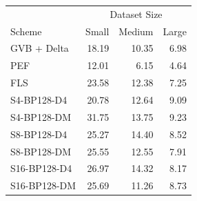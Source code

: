 \begin{tabular}{lrrr}
\toprule
 & \multicolumn{3}{c}{Dataset Size} \\
Scheme & Small & Medium & Large \\
\midrule
GVB + Delta & 18.19 & 10.35 & 6.98 \\
PEF & 12.01 & 6.15 & 4.64 \\
FLS & 23.58 & 12.38 & 7.25 \\
S4-BP128-D4 & 20.78 & 12.64 & 9.09 \\
S4-BP128-DM & 31.75 & 13.75 & 9.23 \\
S8-BP128-D4 & 25.27 & 14.40 & 8.52 \\
S8-BP128-DM & 25.55 & 12.55 & 7.91 \\
S16-BP128-D4 & 26.97 & 14.32 & 8.17 \\
S16-BP128-DM & 25.69 & 11.26 & 8.73 \\
\bottomrule
\end{tabular}
